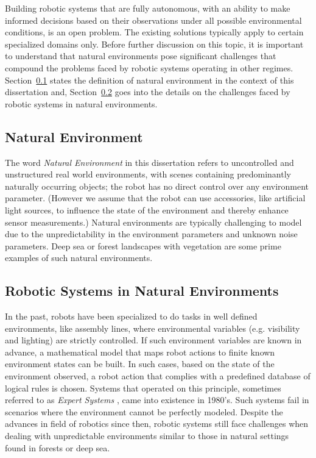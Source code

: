 \documentclass {udthesis}
\begin{document}
Building robotic systems that are fully autonomous, with an ability to make informed decisions based on their observations under all possible environmental conditions, is an open problem.
The existing solutions typically apply to certain specialized domains only. 
Before further discussion on this topic, it is important to
understand that natural environments pose significant challenges that compound the problems faced by robotic systems operating in other regimes.
Section~\ref{sec:nat_environ_def} states the definition of natural environment in the context of this dissertation and, Section~\ref{sec:robots_nat_environ} goes into the details on the challenges faced by robotic systems in natural environments.


\subsection{Natural Environment}
\label{sec:nat_environ_def}

The word \emph{Natural Environment} in this dissertation refers to uncontrolled and unstructured real world environments, with scenes containing predominantly naturally occurring objects; the robot has 
no direct control over any environment parameter. (However we assume that the robot can use accessories, like artificial light sources, to influence the state of the environment and thereby enhance sensor measurements.) 
Natural environments are typically challenging to model due to the unpredictability in the environment parameters and unknown noise parameters. 
Deep sea or forest landscapes with vegetation are some prime examples of such natural environments.


\subsection{Robotic Systems in Natural Environments}
\label{sec:robots_nat_environ}

In the past, robots have been specialized to do tasks in well defined environments, like assembly lines, where environmental variables (e.g. visibility and lighting) are strictly controlled. If such environment variables are known in advance, a mathematical model that maps robot actions to finite known environment states can be built. In such cases, based on the state of the environment observed, a robot action that complies with a predefined database of logical rules is chosen. Systems that operated on this principle, sometimes referred to as \emph{Expert Systems} 
\cite{russel}, came into existence in 1980's. Such systems fail in scenarios where the environment cannot be perfectly modeled. Despite the advances in field of robotics since then, robotic systems still face challenges when dealing with unpredictable environments similar to those in natural settings found in forests or deep sea.
\end{document}
